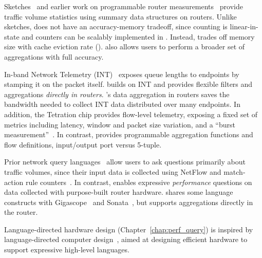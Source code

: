  Sketches~\cite{univmon, flowradar, counterbraids, dream} and
earlier work on programmable router measurements~\cite{progme, opensketch}
provide traffic volume statistics using summary data structures on routers.
Unlike sketches, \TheSystem does not have an accuracy-memory tradeoff, since
counting is linear-in-state and counters can be scalably implemented in \TheSystem. Instead,
\TheSystem trades off memory size with cache eviction rate ().
\TheSystem also allows users to perform a broader set of aggregations with full
accuracy.


%

In-band Network Telemetry (INT)~\cite{int, tpp} exposes queue lengths to
endpoints by stamping it on the packet itself. \TheSystem builds on INT and
provides flexible filters and aggregations {\em directly in routers}.
\TheSystem's data aggregation in routers saves the bandwidth needed to collect
INT data distributed over many endpoints.  In addition, the Tetration chip
provides flow-level telemetry, exposing a fixed set of metrics including
latency, window and packet size variation, and a ``burst
measurement''~\cite{tetration-telemetry}. In contrast, \TheSystem provides
programmable aggregation functions and flow definitions, \eg input/output port versus 5-tuple.

 Prior network query languages~\cite{gigascope,
frenetic, path_query, streaming-monitoring} allow users to ask questions
primarily about traffic volumes, since their input data is
collected using NetFlow and match-action rule counters~\cite{openflow}. In
contrast, \TheSystem enables expressive {\em performance} questions on
data collected with purpose-built router hardware. \TheSystem shares some
language constructs with Gigascope~\cite{gigascope} and
Sonata~\cite{streaming-monitoring}, but supports aggregations directly in the
router.

 Language-directed hardware design (Chapter~\ref{chap:perf_query})
is inspired by language-directed computer design~\cite{language-directed-computer-design,
ditzel_patterson, soar}, aimed at designing efficient hardware to support
expressive high-level languages.
